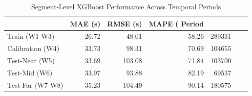 \begin{table}
\caption{Segment-Level XGBoost Performance Across Temporal Periods}
\label{tab:segment_xgboost_performance}
\begin{tabular}{lrrrr}
\toprule
 & MAE (s) & RMSE (s) & MAPE (%
Period &  &  &  &  \\
\midrule
Train (W1-W3) & 26.72 & 48.01 & 58.26 & 289331 \\
Calibration (W4) & 33.73 & 98.31 & 70.69 & 104655 \\
Test-Near (W5) & 33.69 & 103.08 & 71.84 & 103700 \\
Test-Mid (W6) & 33.97 & 93.88 & 82.19 & 69537 \\
Test-Far (W7-W8) & 35.23 & 104.49 & 90.14 & 180575 \\
\bottomrule
\end{tabular}
\end{table}
